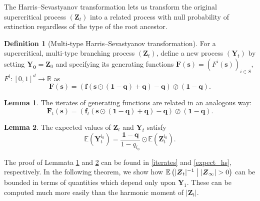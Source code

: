 \documentclass[preprint,3p,12pt]{elsarticle}
\theoremstyle{definition}
\newtheorem{definition}{Definition}
\newtheorem{lemma}{Lemma}
\begin{document}
The Harris--Sevastyanov transformation lets us transform the original supercritical process $(\boldsymbol{Z}_t)$ into a related process with null probability of extinction regardless of the type of the root ancestor. 
\begin{definition}[Multi-type Harris--Sevastyanov transformation]
  For a supercritical, multi-type branching process $(\boldsymbol{Z}_t)$, define a new process $(\boldsymbol{Y}_t)$ by setting $\boldsymbol{Y_0}=\boldsymbol{Z}_0$ and specifying its generating functions $\boldsymbol{F}(\boldsymbol{s})=(F^i(\boldsymbol{s}))_{i \in S}$, $F^i : [0,1]^{d}\rightarrow \mathbb{R}$ as
\begin{equation*}
\boldsymbol{F}(\boldsymbol{s}) = (\boldsymbol{f}(\boldsymbol{s} \odot (\boldsymbol{1}-\boldsymbol{q})+\boldsymbol{q}) - \boldsymbol{q})\oslash(\boldsymbol{1}-\boldsymbol{q}).
\end{equation*}
\end{definition}
\begin{lemma}\label{lemma:iterates}
 The iterates of generating functions are related in an analogous way:
\begin{equation*}
    \boldsymbol{F}_t(\boldsymbol{s}) = (\boldsymbol{f}_t(\boldsymbol{s} \odot (\boldsymbol{1}-\boldsymbol{q})+\boldsymbol{q}) - \boldsymbol{q})\oslash(\boldsymbol{1}-\boldsymbol{q}).
\end{equation*}
\end{lemma}
\begin{lemma}\label{lemma:expected}
The expected values of $\boldsymbol{Z}_t$ and $\boldsymbol{Y}_t$ satisfy
\begin{equation*}
    \mathbb{E}(\boldsymbol{Y}_t^{i_0}) = \frac{\boldsymbol{1}-\boldsymbol{q}}{1-q_{i_0}}\odot\mathbb{E}(\boldsymbol{Z}_t^{i_0}).
\end{equation*}
 \end{lemma}
 The proof of Lemmata \ref{lemma:iterates} and \ref{lemma:expected} can be found in \ref{iterates} and \ref{expect_hs}, respectively.
In the following theorem, we show how $\mathbb{E}\left(|\boldsymbol{Z}_t|^{-1}\bigm| |\boldsymbol{Z}_{\infty}| > 0\right)$ can be bounded in terms of quantities which depend only upon $\boldsymbol{Y}_1$. These can be computed much more easily than the harmonic moment of $|\boldsymbol{Z}_t|$.
\end{document}
